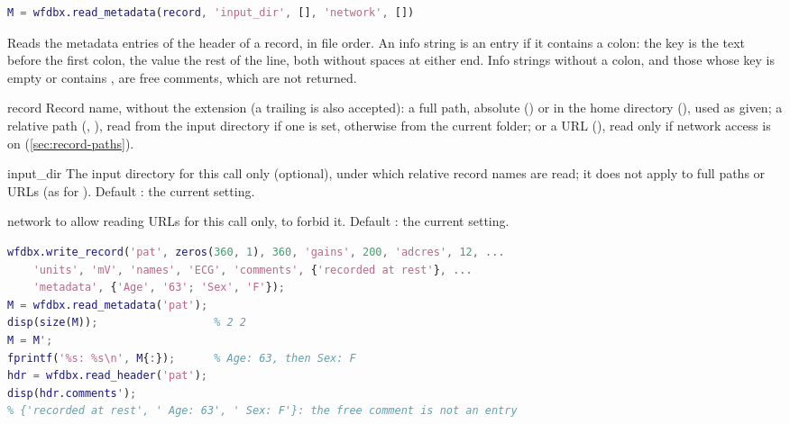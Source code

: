 \begin{lstlisting}[language=Matlab,style=signature]
M = wfdbx.read_metadata(record, 'input_dir', [], 'network', [])
\end{lstlisting}
Reads the metadata entries of the header of a record, in file order. An info string is an
entry if it contains a colon: the key is the text before the first colon, the value the
rest of the line, both without spaces at either end. Info strings without a colon, and
those whose key is empty or contains \code{\#}, are free comments, which are not returned.
\begin{params}
\item[record] Record name, without the  extension (a trailing 
  is also accepted): a full path, absolute () or in the home
  directory (), used as given; a relative path
  (, ), read from the input directory if one is set,
  otherwise from the current folder; or a URL
  (), read only if network access is
  on (\cref{sec:record-paths}).
\item[input\_dir] The input directory for this call only (optional), under which
  relative record names are read; it does not apply to full paths or URLs (as for
  ). Default \code{[]}: the current setting.
\item[network]  to allow reading URLs for this call only,  to
  forbid it. Default \code{[]}: the current setting.
\end{params}
\begin{lstlisting}[language=Matlab,style=example]
wfdbx.write_record('pat', zeros(360, 1), 360, 'gains', 200, 'adcres', 12, ...
    'units', 'mV', 'names', 'ECG', 'comments', {'recorded at rest'}, ...
    'metadata', {'Age', '63'; 'Sex', 'F'});
M = wfdbx.read_metadata('pat');
disp(size(M));                  % 2 2
M = M';
fprintf('%s: %s\n', M{:});      % Age: 63, then Sex: F
hdr = wfdbx.read_header('pat');
disp(hdr.comments');
% {'recorded at rest', ' Age: 63', ' Sex: F'}: the free comment is not an entry
\end{lstlisting}

